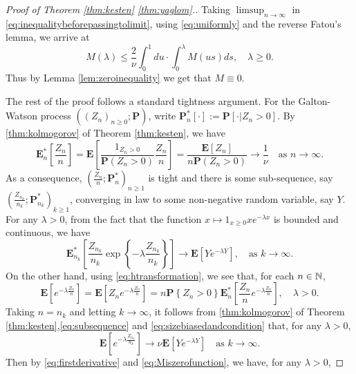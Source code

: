 \documentclass[12pt]{amsart}
\numberwithin{equation}{section}
\newcommand{\prob}{\mathbf P}
\newcommand{\brac}[1]{\left[ #1 \right]}
\newcommand{\set}[1]{\left\{ #1 \right\}}
\newcommand{\expct}{\mathbf E}
\begin{document}
\begin{proof}[Proof of Theorem \ref{thm:kesten} \eqref{thm:yaglom}.]
    Taking $\limsup_{n\to\infty}$ in
    \eqref{eq:inequalitybeforepassingtolimit}, using \eqref{eq:uniformly} and the reverse Fatou's lemma, we arrive at
\begin{equation*}
	    M(\lambda)
    \leq
        \frac{2}{\nu}\int_0^1du
    \cdot
    	\int_0^\lambda M(us)ds,
    \quad
    	\lambda\geq 0.
\end{equation*}
	Thus by Lemma \ref{lem:zeroinequality} we get that $M\equiv 0$.
\par
	The rest of the proof follows a standard tightness argument.
	For the Galton-Watson process $((Z_n)_{n\ge 0};\prob)$, write $\prob_n^*[\cdot]:=\prob[\cdot|Z_n>0]$.
	By \eqref{thm:kolmogorov} of Theorem \ref{thm:kesten}, we have
\begin{equation*}
	    \expct_n^*\brac{\frac{Z_n}{n}}
	=
		 \expct\brac{\frac{1_{Z_n>0}}{\prob(Z_n>0)}\frac{Z_n}{n}}
	=
	   	     \frac{\expct\brac{Z_n}}{n\prob(Z_n>0)}
    \to
        \frac{1}{\nu}
   \quad
				\text{as }n\to\infty.
\end{equation*}
	As a consequence, $(\frac{Z_n}{n};\prob_n^*)_{n\ge 1}$ is tight and there is some sub-sequence, say $(\frac{Z_{n_k}}{n_k};\prob_{n_k}^*)_{k\ge 1}$, converging in law to some non-negative random variable, say $Y$.
		For any $\lambda > 0$,
	from the fact that the function $x\mapsto 1_{x\geq 0}xe^{-\lambda x}$ is bounded and continuous, we have
\begin{equation}
\label{eq:subsequence}
	    \expct_{n_k}^*\brac{\frac{Z_{n_k}}{n_k}\exp\set{-\lambda\frac{Z_{n_k}}{n_k}}}
	\to
	    \expct\brac{Ye^{-\lambda Y}},
	\quad
				\text{as }k\to\infty.
\end{equation}
	On the other hand, using \eqref{eq:htransformation}, we see that, for each $n\in\mathbb N$,
\begin{equation}
\label{eq:sizebiasedandcondition}
	    \expct\brac{e^{-\lambda\frac{\dot Z_n}{n}}}
	=
	    \expct\brac{Z_n e^{-\lambda\frac{Z_n}{n}}}
	=
		n\prob\set{Z_n>0}\expct_n^*\brac{\frac{Z_n}{n}e^{-\lambda\frac{Z_n}{n}}},
		\quad \lambda > 0.
	\end{equation}
	Taking $n=n_k$ and letting $k\to\infty$, it follows from \eqref{thm:kolmogorov} of Theorem \ref{thm:kesten},\eqref{eq:subsequence} and \eqref{eq:sizebiasedandcondition} that,
		for any $\lambda >0$,
	\begin{equation*}
	    \expct\brac{e^{-\lambda\frac{\dot Z_{n_k}}{n_k}}}
	\to
		\nu\expct\brac{Ye^{-\lambda Y}}%
		\quad
		\text{as } k\to \infty.
	\end{equation*}
	Then by \eqref{eq:firstderivative} and \eqref{eq:Miszerofunction}, we have, for any $\lambda >0$,

\end{proof}
\end{document}
